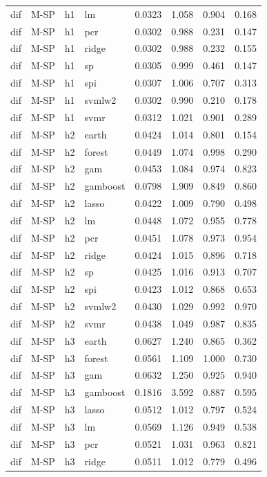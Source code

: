 \begin{ThreePartTable}
\begin{longtable}[t]{llclcccc}
dif & M-SP & h1 & lm & 0.0323 & 1.058 & 0.904 & 0.168\\
dif & M-SP & h1 & pcr & 0.0302 & 0.988 & 0.231 & 0.147\\
dif & M-SP & h1 & ridge & 0.0302 & 0.988 & 0.232 & 0.155\\
dif & M-SP & h1 & sp & 0.0305 & 0.999 & 0.461 & 0.147\\
dif & M-SP & h1 & spi & 0.0307 & 1.006 & 0.707 & 0.313\\
dif & M-SP & h1 & svmlw2 & 0.0302 & 0.990 & 0.210 & 0.178\\
dif & M-SP & h1 & svmr & 0.0312 & 1.021 & 0.901 & 0.289\\
\addlinespace
dif & M-SP & h2 & earth & 0.0424 & 1.014 & 0.801 & 0.154\\
dif & M-SP & h2 & forest & 0.0449 & 1.074 & 0.998 & 0.290\\
dif & M-SP & h2 & gam & 0.0453 & 1.084 & 0.974 & 0.823\\
dif & M-SP & h2 & gamboost & 0.0798 & 1.909 & 0.849 & 0.860\\
dif & M-SP & h2 & lasso & 0.0422 & 1.009 & 0.790 & 0.498\\
dif & M-SP & h2 & lm & 0.0448 & 1.072 & 0.955 & 0.778\\
dif & M-SP & h2 & pcr & 0.0451 & 1.078 & 0.973 & 0.954\\
dif & M-SP & h2 & ridge & 0.0424 & 1.015 & 0.896 & 0.718\\
dif & M-SP & h2 & sp & 0.0425 & 1.016 & 0.913 & 0.707\\
dif & M-SP & h2 & spi & 0.0423 & 1.012 & 0.868 & 0.653\\
dif & M-SP & h2 & svmlw2 & 0.0430 & 1.029 & 0.992 & 0.970\\
dif & M-SP & h2 & svmr & 0.0438 & 1.049 & 0.987 & 0.835\\
\addlinespace
dif & M-SP & h3 & earth & 0.0627 & 1.240 & 0.865 & 0.362\\
dif & M-SP & h3 & forest & 0.0561 & 1.109 & 1.000 & 0.730\\
dif & M-SP & h3 & gam & 0.0632 & 1.250 & 0.925 & 0.940\\
dif & M-SP & h3 & gamboost & 0.1816 & 3.592 & 0.887 & 0.595\\
dif & M-SP & h3 & lasso & 0.0512 & 1.012 & 0.797 & 0.524\\
dif & M-SP & h3 & lm & 0.0569 & 1.126 & 0.949 & 0.538\\
dif & M-SP & h3 & pcr & 0.0521 & 1.031 & 0.963 & 0.821\\
dif & M-SP & h3 & ridge & 0.0511 & 1.012 & 0.779 & 0.496\\

\end{longtable}
\end{ThreePartTable}
